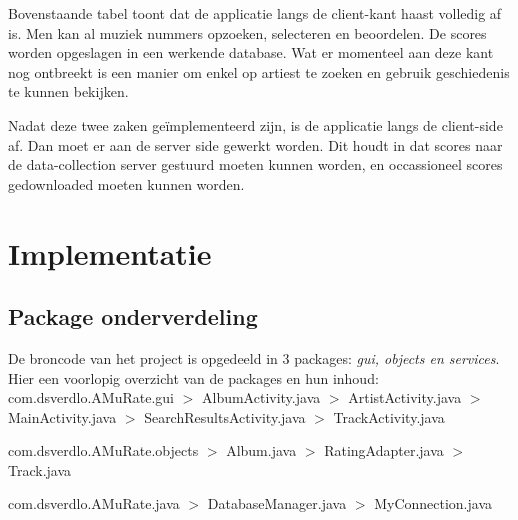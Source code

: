 \documentclass[11pt,a4paper]{article}
\begin{document}
	Bovenstaande tabel toont dat de applicatie langs de client-kant haast volledig af is. Men kan al muziek nummers opzoeken, selecteren en beoordelen. De scores worden opgeslagen in een werkende database. Wat er momenteel aan deze kant nog ontbreekt is een manier om enkel op artiest te zoeken en gebruik geschiedenis te kunnen bekijken. 
	\\ \newline
	
Nadat deze twee zaken geïmplementeerd zijn, is de applicatie langs de client-side af. Dan moet er aan de server side gewerkt worden. Dit houdt in dat scores naar de data-collection server gestuurd moeten kunnen worden, en occassioneel scores gedownloaded moeten kunnen worden. \\





\section{Implementatie}
	\subsection{Package onderverdeling}
		\normalsize  
		De broncode van het project is opgedeeld in 3 packages: \textit{gui, objects en services}. Hier een voorlopig overzicht van de packages en hun inhoud:\\
		
		 com.dsverdlo.AMuRate.gui \newline		
		 $>$ AlbumActivity.java \newline
		 $>$ ArtistActivity.java \newline
		 $>$ MainActivity.java \newline
		 $>$ SearchResultsActivity.java\newline 
		 $>$ TrackActivity.java \newline
		 
		com.dsverdlo.AMuRate.objects \newline
		$>$ Album.java \newline
		$>$ RatingAdapter.java \newline
		$>$ Track.java \newline
		
		com.dsverdlo.AMuRate.java \newline
		$>$ DatabaseManager.java \newline
		$>$ MyConnection.java \newline
		
\end{document}
